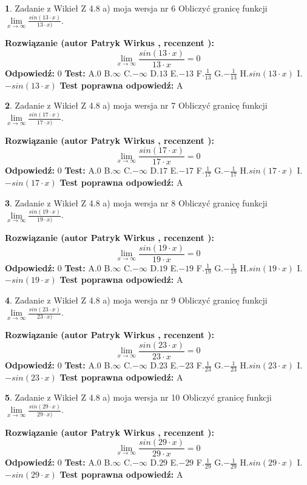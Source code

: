 \documentclass[12pt, a4paper]{article}
\theoremstyle{definition} %
\newtheorem{zad}{}
\newcommand{\zadStart}[1]{\begin{zad}#1\newline}
\newcommand{\zadStop}{\end{zad}}
\newcommand{\rozwStart}[2]{\noindent \textbf{Rozwiązanie (autor #1 , recenzent #2): }\newline}
\newcommand{\rozwStop}{\newline}
\newcommand{\odpStart}{\noindent \textbf{Odpowiedź:}\newline}
\newcommand{\odpStop}{\newline}
\newcommand{\testStart}{\noindent \textbf{Test:}\newline}
\newcommand{\testStop}{\newline}
\newcommand{\kluczStart}{\noindent \textbf{Test poprawna odpowiedź:}\newline}
\newcommand{\kluczStop}{\newline}
\begin{document}
\zadStart{Zadanie z Wikieł Z 4.8 a) moja wersja nr 6}
Obliczyć granicę funkcji $\lim\limits_{x\to \infty}\frac{sin(13\cdot x)}{13\cdot x)}$.
\zadStop
\rozwStart{Patryk Wirkus}{}
$$\lim\limits_{x\to \infty}\frac{sin(13\cdot x)}{13\cdot x}=
0$$
\rozwStop
\odpStart
$0$
\odpStop
\testStart
A.$0$ B.$\infty$ C.$-\infty$ D.$13$ E.$-13$
F.$\frac{1}{13}$ G.$-\frac{1}{13}$
H.$sin(13\cdot x)$
I.$-sin(13\cdot x)$
\testStop
\kluczStart
A
\kluczStop



\zadStart{Zadanie z Wikieł Z 4.8 a) moja wersja nr 7}
Obliczyć granicę funkcji $\lim\limits_{x\to \infty}\frac{sin(17\cdot x)}{17\cdot x)}$.
\zadStop
\rozwStart{Patryk Wirkus}{}
$$\lim\limits_{x\to \infty}\frac{sin(17\cdot x)}{17\cdot x}=
0$$
\rozwStop
\odpStart
$0$
\odpStop
\testStart
A.$0$ B.$\infty$ C.$-\infty$ D.$17$ E.$-17$
F.$\frac{1}{17}$ G.$-\frac{1}{17}$
H.$sin(17\cdot x)$
I.$-sin(17\cdot x)$
\testStop
\kluczStart
A
\kluczStop



\zadStart{Zadanie z Wikieł Z 4.8 a) moja wersja nr 8}
Obliczyć granicę funkcji $\lim\limits_{x\to \infty}\frac{sin(19\cdot x)}{19\cdot x)}$.
\zadStop
\rozwStart{Patryk Wirkus}{}
$$\lim\limits_{x\to \infty}\frac{sin(19\cdot x)}{19\cdot x}=
0$$
\rozwStop
\odpStart
$0$
\odpStop
\testStart
A.$0$ B.$\infty$ C.$-\infty$ D.$19$ E.$-19$
F.$\frac{1}{19}$ G.$-\frac{1}{19}$
H.$sin(19\cdot x)$
I.$-sin(19\cdot x)$
\testStop
\kluczStart
A
\kluczStop



\zadStart{Zadanie z Wikieł Z 4.8 a) moja wersja nr 9}
Obliczyć granicę funkcji $\lim\limits_{x\to \infty}\frac{sin(23\cdot x)}{23\cdot x)}$.
\zadStop
\rozwStart{Patryk Wirkus}{}
$$\lim\limits_{x\to \infty}\frac{sin(23\cdot x)}{23\cdot x}=
0$$
\rozwStop
\odpStart
$0$
\odpStop
\testStart
A.$0$ B.$\infty$ C.$-\infty$ D.$23$ E.$-23$
F.$\frac{1}{23}$ G.$-\frac{1}{23}$
H.$sin(23\cdot x)$
I.$-sin(23\cdot x)$
\testStop
\kluczStart
A
\kluczStop



\zadStart{Zadanie z Wikieł Z 4.8 a) moja wersja nr 10}
Obliczyć granicę funkcji $\lim\limits_{x\to \infty}\frac{sin(29\cdot x)}{29\cdot x)}$.
\zadStop
\rozwStart{Patryk Wirkus}{}
$$\lim\limits_{x\to \infty}\frac{sin(29\cdot x)}{29\cdot x}=
0$$
\rozwStop
\odpStart
$0$
\odpStop
\testStart
A.$0$ B.$\infty$ C.$-\infty$ D.$29$ E.$-29$
F.$\frac{1}{29}$ G.$-\frac{1}{29}$
H.$sin(29\cdot x)$
I.$-sin(29\cdot x)$
\testStop
\kluczStart
A
\kluczStop
\end{document}
